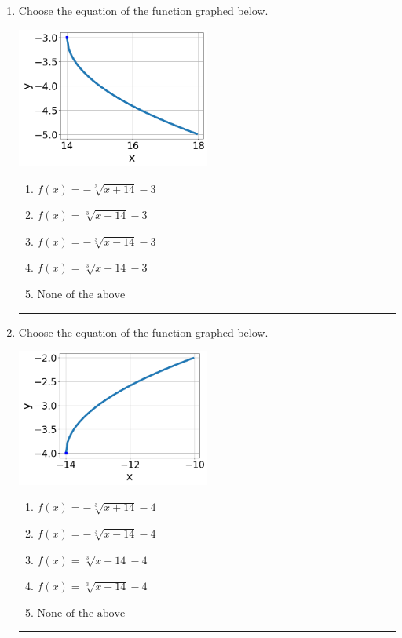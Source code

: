 \documentclass[14pt]{extbook}
\newcommand{\litem}[1]{\item#1\hspace*{-1cm}\rule{\textwidth}{0.4pt}}
\begin{document}
\begin{enumerate}
{\begin{enumerate}[label=\Alph*.]
\end{enumerate} }
\litem{
Choose the equation of the function graphed below.
\begin{center}
    \includegraphics[width=0.5\textwidth]{../Figures/radicalGraphToEquationC.png}
\end{center}
\begin{enumerate}[label=\Alph*.]
\item \( f(x) = - \sqrt[3]{x + 14} - 3 \)
\item \( f(x) = \sqrt[3]{x - 14} - 3 \)
\item \( f(x) = - \sqrt[3]{x - 14} - 3 \)
\item \( f(x) = \sqrt[3]{x + 14} - 3 \)
\item \( \text{None of the above} \)

\end{enumerate} }
\litem{
Choose the equation of the function graphed below.
\begin{center}
    \includegraphics[width=0.5\textwidth]{../Figures/radicalGraphToEquationCopyC.png}
\end{center}
\begin{enumerate}[label=\Alph*.]
\item \( f(x) = - \sqrt[3]{x + 14} - 4 \)
\item \( f(x) = - \sqrt[3]{x - 14} - 4 \)
\item \( f(x) = \sqrt[3]{x + 14} - 4 \)
\item \( f(x) = \sqrt[3]{x - 14} - 4 \)
\item \( \text{None of the above} \)


\end{enumerate}}
\end{enumerate}
\end{document}
